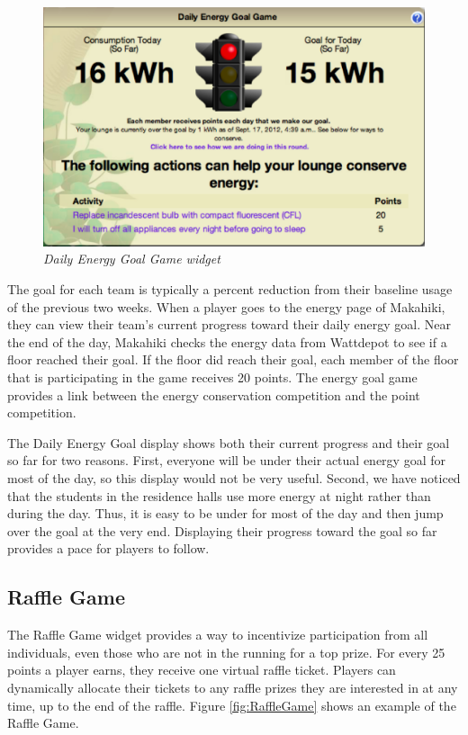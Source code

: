 \begin{figure}[th]
  \center
  \includegraphics[width=0.95\columnwidth]{daily-energy-goal-game.eps}
  \caption{\em \small Daily Energy Goal Game widget}
  \label{fig:DailyEnergyGoal}
\end{figure}

The goal for each team is typically a percent reduction from their baseline usage of the previous two weeks. When a player goes to the energy page of Makahiki, they can view their team's current progress toward their daily energy goal. Near the end of the day, Makahiki checks the energy data from Wattdepot to see if a floor reached their goal. If the floor did reach their goal, each member of the floor that is participating in the game receives 20 points. The energy goal game provides a link between the energy conservation competition and the point competition.

The Daily Energy Goal display shows both their current progress and their goal so far for two reasons. First, everyone will be under their actual energy goal for most of the day, so this display would not be very useful. Second, we have noticed that the students in the residence halls use more energy at night rather than during the day. Thus, it is easy to be under for most of the day and then jump over the goal at the very end. Displaying their progress toward the goal so far provides a pace for players to follow.

\subsection{Raffle Game}

The Raffle Game widget provides a way to incentivize participation from all individuals, even those who are not in the running for a top prize. For every 25 points a player earns, they receive one virtual raffle ticket. Players can dynamically allocate their tickets to any raffle prizes they are interested in at any time, up to the end of the raffle.  Figure \ref{fig:RaffleGame} shows an example of the Raffle Game. 


